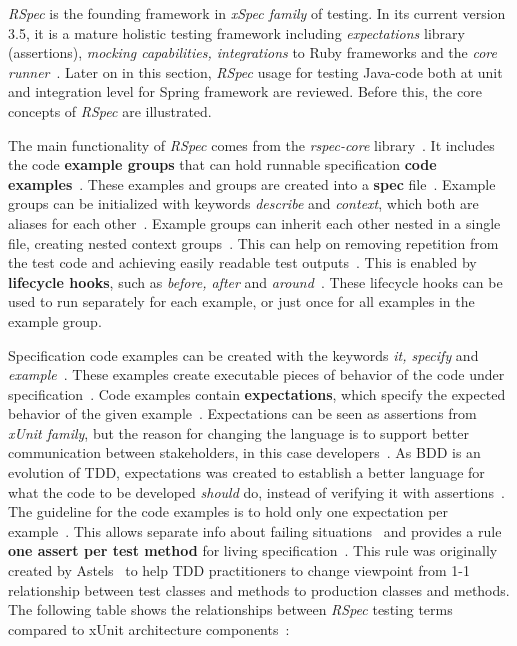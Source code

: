     \textit{RSpec} is the founding framework in \textit{xSpec family} of testing. In its current version 3.5, it is a mature holistic testing
    framework including \textit{expectations} library (assertions), \textit{mocking capabilities, integrations} to Ruby frameworks and the \textit{core runner}~\cite{rspecdoc}.
    Later on in this section, \textit{RSpec} usage for testing Java-code both at unit and integration level for Spring framework are reviewed.
    Before this, the core concepts of \textit{RSpec} are illustrated.

    The main functionality of \textit{RSpec} comes from the \textit{rspec-core} library~\cite{rspecdoc}. It includes the code \textbf{example groups} that can hold runnable
    specification \textbf{code examples}~\cite{chelimsky2010rspec}. These examples and groups are created into a \textbf{spec} file~\cite{chelimsky2010rspec}.
    Example groups can be initialized with keywords \textit{describe}
    and \textit{context}, which both are aliases for each other~\cite{rspec-core}. Example groups can inherit each other nested in a single
    file, creating nested context groups~\cite{rspec-core}. This can help on removing
    repetition from the test code
    and achieving easily readable test outputs~\cite{chelimsky2010rspec}. This is enabled by \textbf{lifecycle hooks},
    such as \textit{before, after} and \textit{around}~\cite{chelimsky2010rspec}.
    These lifecycle hooks can be used to run separately for each example, or just once for all examples in the example group.

    Specification code examples can be created with the keywords \textit{it, specify} and \textit{example}~\cite{rspec-core}.
    These examples create executable pieces of behavior of the code under specification~\cite{chelimsky2010rspec}. Code examples
    contain \textbf{expectations}, which specify the expected behavior of the given example~\cite{chelimsky2010rspec}. Expectations can
    be seen as assertions from \textit{xUnit family}, but the reason for changing the language is to support better communication
    between stakeholders, in this case developers~\cite{chelimsky2010rspec}. As BDD is an evolution of TDD, expectations
    was created to establish a better language for what the code to be developed \textit{should} do, instead of verifying it
    with assertions~\cite{astels2006new}. The guideline for the code examples is to hold only one expectation per example~\cite{chelimsky2010rspec}.
    This allows separate info about failing situations~\cite{chelimsky2010rspec} and provides a rule \textbf{one assert per test method}
    for living specification~\cite{astels2006new}. This rule was originally created by Astels~\cite{astels2006new} to
    help TDD practitioners to change viewpoint from 1-1 relationship between test classes and methods to production classes
    and methods.
    The following table shows the relationships between \textit{RSpec} testing terms compared to xUnit architecture components~\cite{chelimsky2010rspec}:

